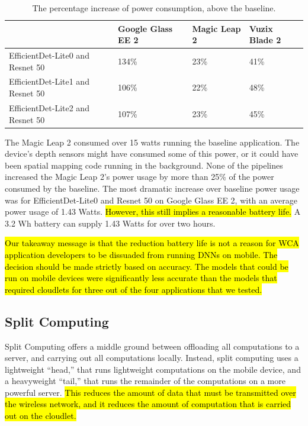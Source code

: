 \begin{table}
\begin{tabular}{|l||l|l|l|}
  \hline
  & Google Glass EE 2 & Magic Leap 2 & Vuzix Blade 2\\
  \hline
  \hline
  EfficientDet-Lite0 and Resnet 50 & 134\% & 23\% & 41\%\\
  EfficientDet-Lite1 and Resnet 50 & 106\% & 22\% & 48\%\\
  EfficientDet-Lite2 and Resnet 50 & 107\% & 23\% & 45\%\\
  \hline
\end{tabular}
  \caption{
    The percentage increase of power consumption, above the baseline.
  }\label{tab:mobile_power_pi}
\end{table}

The Magic Leap 2 consumed over 15 watts running the baseline application.
The device's depth sensors might have consumed some of this power, or it could
have been spatial mapping code running in the background.
None of the pipelines increased the Magic Leap 2's power usage by more than 25\%
of the power consumed by the baseline.
The most dramatic increase over baseline power usage was for EfficientDet-Lite0
and Resnet 50 on Google Glass EE 2, with an average power usage of 1.43 Watts.
\hl{
  However, this still implies a reasonable battery life.
}
A 3.2 Wh battery can supply 1.43 Watts for over two hours.

\hl{
  Our takeaway message is that the reduction battery life is not a reason for
  WCA application developers to be dissuaded from running DNNs on mobile.
  The decision should be made strictly based on accuracy.
  The models that could be run on mobile devices were significantly less
  accurate than the models that required cloudlets for three out of the four
  applications that we tested.
}

\subsection{Split Computing}

Split Computing offers a middle ground between offloading all computations to a
server, and carrying out all computations locally.
Instead, split computing uses a lightweight ``head,'' that runs lightweight
computations on the mobile device, and a heavyweight ``tail,'' that runs the
remainder of the computations on a more powerful server.
\hl{
  This reduces the amount of data that must be transmitted over the wireless
  network, and it reduces the amount of computation that is carried out on the
  cloudlet.
}


